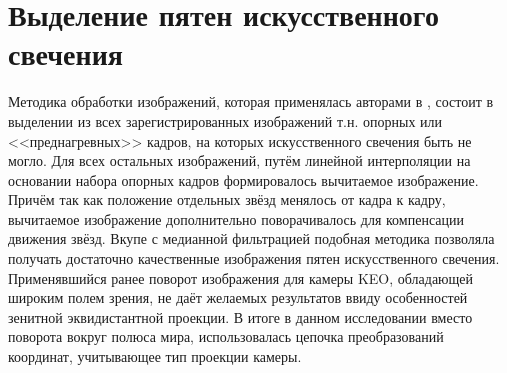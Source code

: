 \documentclass[12pt,a4paper]{article}
\begin{document}
\section{Выделение пятен искусственного свечения} \label{sec:glow}
Методика обработки изображений, которая применялась авторами в \cite{Grach2012}, состоит в выделении из всех зарегистрированных изображений т.н. опорных или <<преднагревных>> кадров, на которых искусственного свечения быть не могло. Для всех остальных изображений, путём линейной интерполяции на основании набора опорных кадров формировалось вычитаемое изображение. Причём так как положение отдельных звёзд менялось от кадра к кадру, вычитаемое изображение дополнительно поворачивалось для компенсации движения звёзд. Вкупе с медианной фильтрацией подобная методика позволяла получать достаточно качественные изображения пятен искусственного свечения. Применявшийся ранее поворот изображения для камеры KEO, обладающей широким полем зрения, не даёт желаемых результатов ввиду особенностей зенитной эквидистантной проекции. В итоге в данном исследовании вместо поворота вокруг полюса мира, использовалась цепочка преобразований координат, учитывающее тип проекции камеры.
\end{document}

